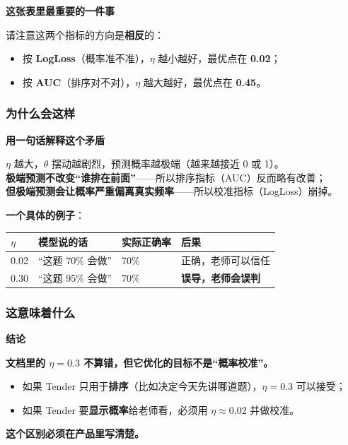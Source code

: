 \documentclass[UTF8,a4paper,11pt]{ctexart}
\newenvironment{explainbox}[1]
{\begin{center}\begin{minipage}{0.94\textwidth}\colorbox{boxbg}{\parbox{0.92\textwidth}{\textbf{#1}\par\vspace{2pt}}}}
{\end{minipage}\end{center}}
\newcommand{\hl}[1]{\textcolor{blue!70!black}{\textbf{#1}}}
\newcommand{\warn}[1]{\textcolor{red!70!black}{\textbf{#1}}}
\begin{document}
\begin{explainbox}{这张表里最重要的一件事}
请注意这两个指标的方向是\textbf{相反}的：
\begin{itemize}[leftmargin=1.4em,itemsep=1pt]
\item 按 \textbf{LogLoss}（概率准不准），$\eta$ 越小越好，最优点在 \textbf{0.02}；
\item 按 \textbf{AUC}（排序对不对），$\eta$ 越大越好，最优点在 \textbf{0.45}。
\end{itemize}
\end{explainbox}

\subsubsection{为什么会这样}

\begin{explainbox}{用一句话解释这个矛盾}
$\eta$ 越大，$\theta$ 摆动越剧烈，预测概率越极端（越来越接近 0 或 1）。\\[3pt]
\textbf{极端预测不改变“谁排在前面”}——所以排序指标（AUC）反而略有改善；\\
\textbf{但极端预测会让概率严重偏离真实频率}——所以校准指标（LogLoss）崩掉。
\end{explainbox}

\textbf{一个具体的例子}：

\begin{center}
\begin{tabular}{p{2.4cm}p{3.4cm}p{3.4cm}p{5.0cm}}
\toprule
$\eta$ & 模型说的话 & 实际正确率 & 后果 \\
\midrule
0.02 & “这题 70\% 会做” & 70\% & 正确，老师可以信任 \\
0.30 & “这题 95\% 会做” & 70\% & \warn{误导，老师会误判} \\
\bottomrule
\end{tabular}
\end{center}

\subsubsection{这意味着什么}

\begin{explainbox}{结论}
\textbf{文档里的 $\eta = 0.3$ 不算错，但它优化的目标不是“概率校准”。}\\
\begin{itemize}[leftmargin=1.4em,itemsep=1pt]
\item 如果 Tender 只用于\textbf{排序}（比如决定今天先讲哪道题），$\eta=0.3$ 可以接受；
\item 如果 Tender 要\textbf{显示概率}给老师看，必须用 $\eta \approx 0.02$ 并做校准。
\end{itemize}
\hl{这个区别必须在产品里写清楚。}
\end{explainbox}
\end{document}
